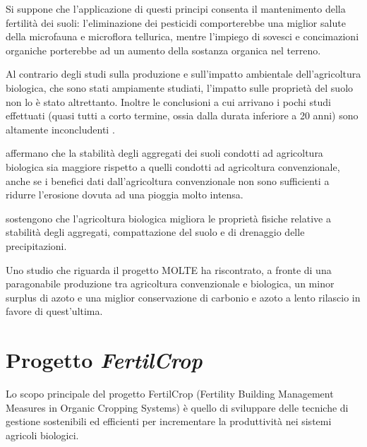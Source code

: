 \documentclass[11pt, a4paper, openright, titlepage, final, language = italian]{book}
\begin{document}
Si suppone che l'applicazione di questi principi consenta il
mantenimento della fertilit\`a dei suoli: l'eliminazione dei pesticidi
comporterebbe una miglior salute della microfauna e microflora
tellurica, mentre l'impiego di sovesci e concimazioni organiche
porterebbe ad un aumento della sostanza organica nel terreno.

Al contrario degli studi sulla produzione e sull'impatto ambientale
dell'agricoltura biologica, che sono stati ampiamente studiati,
l'impatto sulle propriet\`a del suolo non lo \`e stato
altrettanto. Inoltre le conclusioni a cui arrivano i pochi studi
effettuati (quasi tutti a corto termine, ossia dalla durata inferiore
a 20 anni) sono altamente inconcludenti \citep{williams2017organic}.

\citet{siegrist1998does} affermano che la stabilit\`a degli aggregati
dei suoli condotti ad agricoltura biologica sia maggiore rispetto a
quelli condotti ad agricoltura convenzionale, anche se i benefici dati
dall'agricoltura convenzionale non sono sufficienti a ridurre
l'erosione dovuta ad una pioggia molto intensa. 

\citet{williams2017organic} sostengono che l'agricoltura biologica
migliora le propriet\`a fisiche relative a stabilit\`a degli
aggregati, compattazione del suolo e di drenaggio delle
precipitazioni.  

Uno studio che riguarda il progetto MOLTE
\citep{migliorini2014agronomic} ha riscontrato, a fronte di una
paragonabile produzione tra agricoltura convenzionale e biologica, un
minor surplus di azoto e una miglior conservazione di carbonio e azoto
a lento rilascio in favore di quest'ultima.





\section{Progetto \emph{FertilCrop}}
Lo scopo principale del progetto FertilCrop (Fertility Building
Management Measures in Organic Cropping Systems) è quello di
sviluppare delle tecniche di gestione sostenibili ed efficienti per
incrementare la produttivit\`a nei sistemi agricoli biologici.
\end{document}
